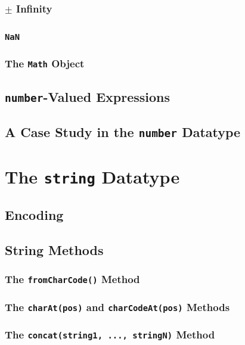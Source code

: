 \documentclass[11pt,letter]{book}
\begin{document}
    \subsection{$\pm$ Infinity}
    
    \subsection{\texttt{NaN}}
    
    \subsection{The \texttt{Math} Object}
    
    \section{\texttt{number}-Valued Expressions}
    
    \section{A Case Study in the \texttt{number} Datatype}
    
    \chapter{The \texttt{string} Datatype}
    
    \section{Encoding}
    
    \section{String Methods}
    
    \subsection{The \texttt{fromCharCode()} Method}
    
    \subsection{The \texttt{charAt(pos)} and \texttt{charCodeAt(pos)} Methods}
    
    \subsection{The \texttt{concat(string1, ..., stringN)} Method}
    
\end{document}
